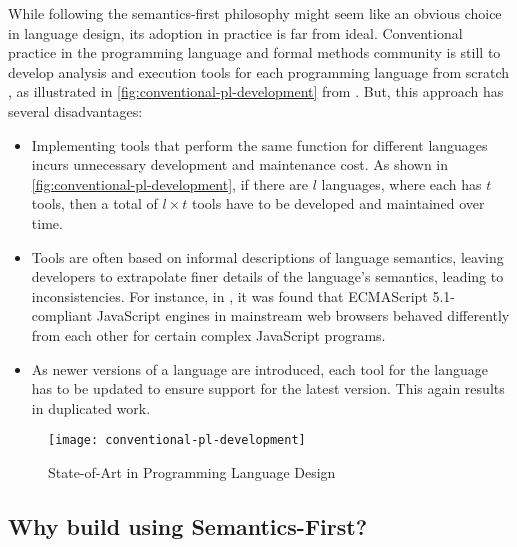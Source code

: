 While following the semantics-first philosophy might seem like an obvious choice
in language design, its adoption in practice is far from ideal.
Conventional practice in the programming language and formal
methods community is still to develop analysis and execution tools for each
programming language from scratch \cite{ChenSETSS19}, as illustrated
in \autoref{fig:conventional-pl-development} from
\cite{ChenSETSS19}. But, this approach has several
disadvantages:
\begin{itemize}
  \item Implementing tools that perform the same function for
    different languages incurs unnecessary development and maintenance cost.
    As shown in \autoref{fig:conventional-pl-development}, if there are
    $l$ languages, where each has $t$ tools, then a total of $l \times t$
    tools have to be developed and maintained over time.
  \item Tools are often based on informal descriptions of language semantics,
    leaving developers to extrapolate finer details of the language's semantics,
    leading to inconsistencies.
    For instance, in \cite{ParkPLDI15}, it was found
    that ECMAScript 5.1-compliant JavaScript engines
    in mainstream web browsers behaved differently from each other
    for certain complex JavaScript programs.
  \item As newer versions of a language are introduced, each
    tool for the language has to be updated to ensure support for the latest
    version. This again results in duplicated work.
\end{itemize}
\begin{figure}[t!]
  \centering
  \texttt{[image: conventional-pl-development]}
  \caption{State-of-Art in Programming Language Design}\label{fig:conventional-pl-development}
\end{figure}

\subsection{Why build \CDSSs{} using Semantics-First?}

